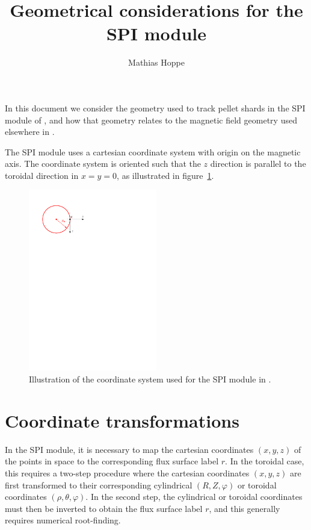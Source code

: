 \documentclass{notes}
\title{Geometrical considerations for the SPI module}
\author{Mathias Hoppe}
\begin{document}
    \maketitle

    \noindent
    In this document we consider the geometry used to track pellet shards in the
    SPI module of \DREAM, and how that geometry relates to the magnetic field
    geometry used elsewhere in \DREAM.

    The SPI module uses a cartesian coordinate system with origin on the
    magnetic axis. The coordinate system is oriented such that the $z$ direction
    is parallel to the toroidal direction in $x=y=0$, as illustrated in
    figure~\ref{fig:geom}.

    \begin{figure}
        \centering
        \includegraphics[width=0.5\textwidth]{figs/SPIgeom.pdf}
        \caption{
            Illustration of the coordinate system used for the SPI module in
            \DREAM.
        }
        \label{fig:geom}
    \end{figure}

    \section{Coordinate transformations}
    In the SPI module, it is necessary to map the cartesian coordinates
    $(x,y,z)$ of the points in space to the corresponding flux surface label
    $r$. In the toroidal case, this requires a two-step procedure where the
    cartesian coordinates $(x,y,z)$ are first transformed to their corresponding
    cylindrical $(R,Z,\varphi)$ or toroidal coordinates $(\rho,\theta,\varphi)$.
    In the second step, the cylindrical or toroidal coordinates must then be
    inverted to obtain the flux surface label $r$, and this generally requires
    numerical root-finding.
\end{document}
